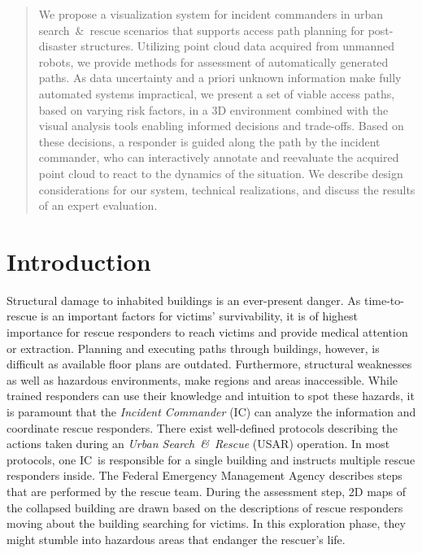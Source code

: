 \documentclass{egpubl}
\def\IC{IC}
\begin{document}
\maketitle

\begin{abstract}
We propose a visualization system for incident commanders in urban search~\&~rescue scenarios that supports access path planning for post-disaster structures. Utilizing point cloud data acquired from unmanned robots, we provide methods for assessment of automatically generated paths. As data uncertainty and a priori unknown information make fully automated systems impractical, we present a set of viable access paths, based on varying risk factors, in a 3D environment combined with the visual analysis tools enabling informed decisions and trade-offs. Based on these decisions, a responder is guided along the path by the incident commander, who can interactively annotate and reevaluate the acquired point cloud to react to the dynamics of the situation. We describe design considerations for our system, technical realizations, and discuss the results of an expert evaluation.

\begin{classification}
\end{classification}


\end{abstract}

\section{Introduction}

Structural damage to inhabited buildings is an ever-present danger. As time-to-rescue is an important factors for victims' survivability, it is of highest importance for rescue responders to reach victims and provide medical attention or extraction. Planning and executing paths through buildings, however, is difficult as available floor plans are outdated. Furthermore, structural weaknesses as well as hazardous environments, make regions and areas inaccessible. While trained responders can use their knowledge and intuition to spot these hazards, it is paramount that the \emph{Incident Commander} (IC) can analyze the information and coordinate rescue responders. There exist well-defined protocols describing the actions taken during an \emph{Urban Search~\&~Rescue} (USAR) operation. In most protocols, one \IC\ is responsible for a single building and instructs multiple rescue responders inside. The Federal Emergency Management Agency describes steps that are performed by the rescue team. During the assessment step, 2D maps of the collapsed building are drawn based on the descriptions of rescue responders moving about the building searching for victims. In this exploration phase, they might stumble into hazardous areas that endanger the rescuer's life.
\end{document}
